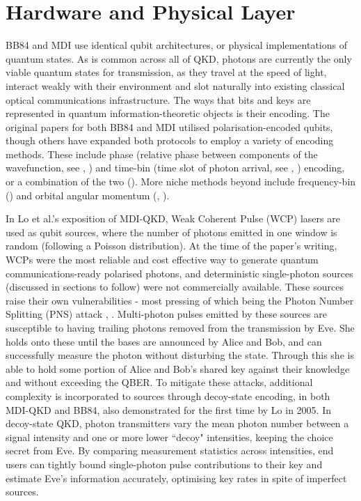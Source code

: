 \documentclass[9pt,technote]{IEEEtran}
\begin{document}
\section{Hardware and Physical Layer}
\label{sect:hardware}
BB84 and MDI use identical qubit architectures, or physical implementations of quantum states. As is common across all of QKD, photons are currently the only viable quantum states for transmission, as they travel at the speed of light, interact weakly with their environment and slot naturally into existing classical optical communications infrastructure. The ways that bits and keys are represented in quantum information-theoretic objects is their encoding. The original papers for both BB84 and MDI utilised polarisation-encoded qubits, though others have expanded both protocols to employ a variety of encoding methods. These include phase (relative phase between components of the wavefunction, see \cite{Townsend1993}, \cite{Tamaki_2012}) and time-bin (time slot of photon arrival, see \cite{Brendel_1999}, \cite{Woodward_2021}) encoding, or a combination of the two (\cite{Liu2013}). More niche methods beyond include frequency-bin (\cite{Tagliavacche_2025}) and orbital angular momentum (\cite{Zhou_2016}, \cite{Vallone_2014}).

In Lo et al.'s exposition of MDI-QKD, Weak Coherent Pulse (WCP) lasers are used as qubit sources, where the number of photons emitted in one window is random (following a Poisson distribution). At the time of the paper's writing, WCPs were the most reliable and cost effective way to generate quantum communications-ready polarised photons, and deterministic single-photon sources (discussed in sections to follow) were not commercially available. These sources raise their own vulnerabilities - most pressing of which being the Photon Number Splitting (PNS) attack \cite{PNS_desc}, \cite{Avanesov2025}. Multi-photon pulses emitted by these sources are susceptible to having trailing photons removed from the transmission by Eve. She holds onto these until the bases are announced by Alice and Bob, and can successfully measure the photon without disturbing the state. Through this she is able to hold some portion of Alice and Bob's shared key against their knowledge and without exceeding the QBER. To mitigate these attacks, additional complexity is incorporated to sources through decoy-state encoding, in both MDI-QKD and BB84, also demonstrated for the first time by Lo \cite{Lo_decoys} in 2005. In decoy-state QKD, photon transmitters vary the mean photon number between a signal intensity and one or more lower ``decoy" intensities, keeping the choice secret from Eve. By comparing measurement statistics across intensities, end users can tightly bound single-photon pulse contributions to their key and estimate Eve's information accurately, optimising key rates in spite of imperfect sources.
\end{document}
